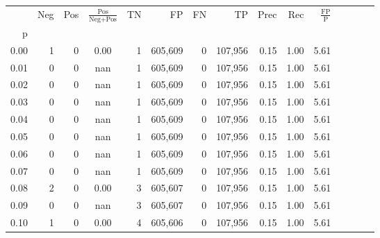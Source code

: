 \begin{tabular}{rrrcrrrrrrrrrrr}
\toprule
{} &     Neg &    Pos & $\frac{\text{Pos}}{\text{Neg}+\text{Pos}}$ &       TN &       FP &       FN &       TP &  Prec &   Rec & $\frac{\text{FP}}{\text{P}}$ \\
p    &         &        &                                            &          &          &          &          &       &       &                              \\
\midrule
0.00 &       1 &      0 &                                       0.00 &        1 &  605,609 &        0 &  107,956 &  0.15 &  1.00 &                         5.61 \\
0.01 &       0 &      0 &                                        nan &        1 &  605,609 &        0 &  107,956 &  0.15 &  1.00 &                         5.61 \\
0.02 &       0 &      0 &                                        nan &        1 &  605,609 &        0 &  107,956 &  0.15 &  1.00 &                         5.61 \\
0.03 &       0 &      0 &                                        nan &        1 &  605,609 &        0 &  107,956 &  0.15 &  1.00 &                         5.61 \\
0.04 &       0 &      0 &                                        nan &        1 &  605,609 &        0 &  107,956 &  0.15 &  1.00 &                         5.61 \\
0.05 &       0 &      0 &                                        nan &        1 &  605,609 &        0 &  107,956 &  0.15 &  1.00 &                         5.61 \\
0.06 &       0 &      0 &                                        nan &        1 &  605,609 &        0 &  107,956 &  0.15 &  1.00 &                         5.61 \\
0.07 &       0 &      0 &                                        nan &        1 &  605,609 &        0 &  107,956 &  0.15 &  1.00 &                         5.61 \\
0.08 &       2 &      0 &                                       0.00 &        3 &  605,607 &        0 &  107,956 &  0.15 &  1.00 &                         5.61 \\
0.09 &       0 &      0 &                                        nan &        3 &  605,607 &        0 &  107,956 &  0.15 &  1.00 &                         5.61 \\
0.10 &       1 &      0 &                                       0.00 &        4 &  605,606 &        0 &  107,956 &  0.15 &  1.00 &                         5.61 \\

\end{tabular}
